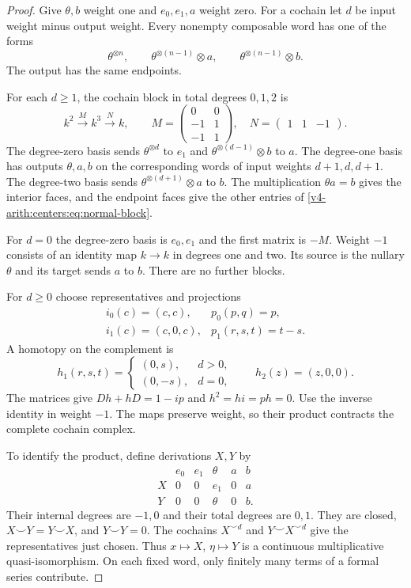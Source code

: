 \begin{proof}
Give $\theta,b$ weight one and $e_0,e_1,a$ weight zero.
For a cochain let $d$ be input weight minus output weight.
Every nonempty composable word has one of the forms
\[
 \theta^{\otimes n},\qquad
 \theta^{\otimes(n-1)}\otimes a,\qquad
 \theta^{\otimes(n-1)}\otimes b.
\]
The output has the same endpoints.

For each $d\geq1$,
the cochain block in total degrees $0,1,2$ is
\begin{equation}\label{v4-arith:centers:eq:normal-block}
 k^2\xrightarrow{M}k^3\xrightarrow{N}k,\qquad
 M=\begin{pmatrix}0&0\\-1&1\\-1&1\end{pmatrix},
 \quad N=\begin{pmatrix}1&1&-1\end{pmatrix}.
\end{equation}
The degree-zero basis sends $\theta^{\otimes d}$ to
$e_1$ and $\theta^{\otimes(d-1)}\otimes b$ to $a$.
The degree-one basis has outputs $\theta,a,b$ on the
corresponding words of input weights $d+1,d,d+1$.
The degree-two basis sends
$\theta^{\otimes(d+1)}\otimes a$ to $b$.
The multiplication $\theta a=b$ gives the interior
faces, and the endpoint faces give the other entries
of \eqref{v4-arith:centers:eq:normal-block}.

For $d=0$ the degree-zero basis is $e_0,e_1$ and the
first matrix is $-M$. Weight $-1$ consists of an
identity map $k\to k$ in degrees one and two. Its source
is the nullary $\theta$ and its target sends $a$ to $b$.
There are no further blocks.

For $d\geq0$ choose representatives and projections
\[
\begin{array}{ll}
 i_0(c)=(c,c),&p_0(p,q)=p,\\
 i_1(c)=(c,0,c),&p_1(r,s,t)=t-s.
\end{array}
\]
A homotopy on the complement is
\[
 h_1(r,s,t)=
 \begin{cases}(0,s),&d>0,\\(0,-s),&d=0,\end{cases}
 \qquad h_2(z)=(z,0,0).
\]
The matrices give $Dh+hD=1-ip$ and $h^2=hi=ph=0$.
Use the inverse identity in weight $-1$. The maps
preserve weight, so their product contracts the
complete cochain complex.

To identify the product, define derivations $X,Y$ by
\[
\begin{array}{c|ccccc}
 &e_0&e_1&\theta&a&b\\\hline
 X&0&0&e_1&0&a\\
 Y&0&0&\theta&0&b.
\end{array}
\]
Their internal degrees are $-1,0$ and their total
degrees are $0,1$. They are closed,
$X\smile Y=Y\smile X$, and $Y\smile Y=0$.
The cochains $X^{\smile d}$ and
$Y\smile X^{\smile d}$ give the representatives just
chosen. Thus $x\mapsto X$, $\eta\mapsto Y$ is a
continuous multiplicative quasi-isomorphism.
On each fixed word, only finitely many terms of a
formal series contribute.


\end{proof}
